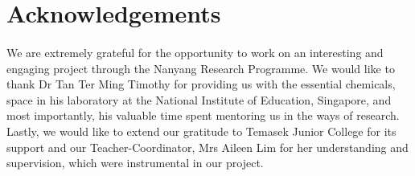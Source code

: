 \documentclass[12pt, twocolumn, a4paper]{article}
\begin{document}
\section*{Acknowledgements}
\paragraph{}We are extremely grateful for the opportunity to work on an interesting and engaging project through the Nanyang Research Programme. We would like to thank Dr Tan Ter Ming Timothy for providing us with the essential chemicals, space in his laboratory at the National Institute of Education, Singapore, and most importantly, his valuable time spent mentoring us in the ways of research. Lastly, we would like to extend our gratitude to Temasek Junior College for its support and our Teacher-Coordinator, Mrs Aileen Lim for her understanding and supervision, which were instrumental in our project.

\footnotesize


\end{document}
